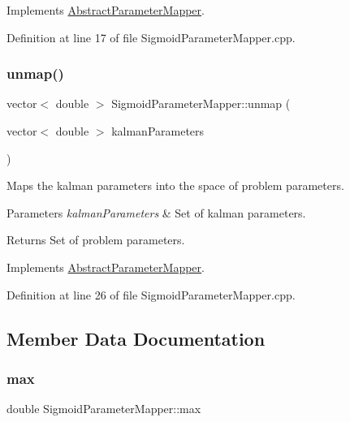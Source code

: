 Implements \mbox{\hyperlink{classAbstractParameterMapper_abb9e78545ff023f2b786b759ec2d23e4}{Abstract\+Parameter\+Mapper}}.



Definition at line 17 of file Sigmoid\+Parameter\+Mapper.\+cpp.

\mbox{\label{classSigmoidParameterMapper_a5b7031c2945f69130e0423427525e256}} 
\subsubsection{\texorpdfstring{unmap()}{unmap()}}
{\footnotesize\ttfamily vector$<$ double $>$ Sigmoid\+Parameter\+Mapper\+::unmap (\begin{DoxyParamCaption}\item[{vector$<$ double $>$}]{kalman\+Parameters }\end{DoxyParamCaption})\hspace{0.3cm}{\ttfamily [virtual]}}

Maps the kalman parameters into the space of problem parameters. 
\begin{DoxyParams}{Parameters}
{\em kalman\+Parameters} & Set of kalman parameters. \\
\hline
\end{DoxyParams}
\begin{DoxyReturn}{Returns}
Set of problem parameters. 
\end{DoxyReturn}


Implements \mbox{\hyperlink{classAbstractParameterMapper_a7fc9715759582e218a3bc38ec43e2d57}{Abstract\+Parameter\+Mapper}}.



Definition at line 26 of file Sigmoid\+Parameter\+Mapper.\+cpp.



\subsection{Member Data Documentation}
\mbox{\label{classSigmoidParameterMapper_a87e681e19a32deadc0231f979636ad17}} 
\subsubsection{\texorpdfstring{max}{max}}
{\footnotesize\ttfamily double Sigmoid\+Parameter\+Mapper\+::max\hspace{0.3cm}{\ttfamily [private]}}


